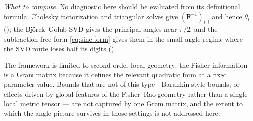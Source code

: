 \documentclass{IEEEtran}
\begin{document}
\emph{What to compute.} No diagnostic here should be evaluated from its definitional formula. Cholesky factorization and triangular solves give $(\mathbf{F}^{-1})_{i,i}$ and hence $\theta_{i}$ (); the Bj\"orck--Golub SVD gives the principal angles near $\pi/2$, and the subtraction-free form \eqref{eq:sine-form} gives them in the small-angle regime where the SVD route loses half its digits ().

The framework is limited to second-order local geometry: the Fisher information is a Gram matrix because it defines the relevant quadratic form at a fixed parameter value. Bounds that are not of this type---Barankin-style bounds, or effects driven by global features of the Fisher--Rao geometry rather than a single local metric tensor
\cite{amari2000} --- are not captured by one Gram matrix, and the extent to which the angle
picture survives in those settings is not addressed here.



\end{document}

